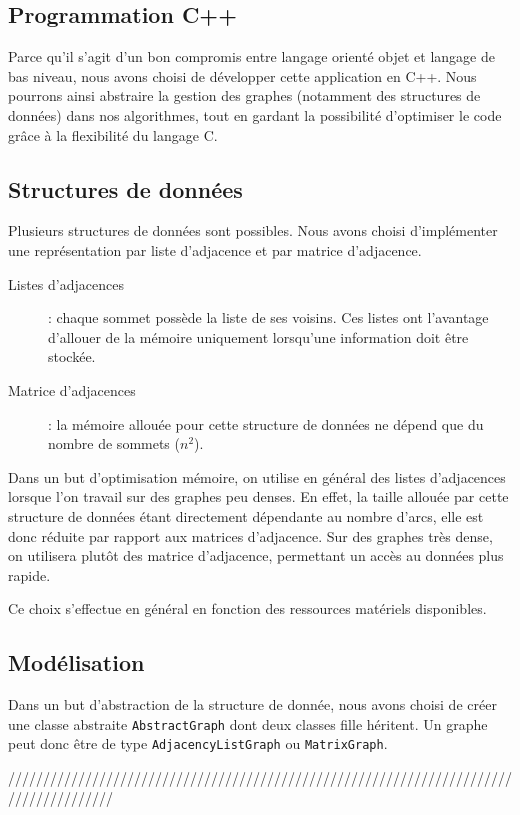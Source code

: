 \subsection{Programmation C++}
Parce qu'il s'agit d'un bon compromis entre langage orienté objet et langage de bas niveau, nous avons choisi de développer cette application en C++. Nous pourrons ainsi abstraire la gestion des graphes (notamment des structures de données) dans nos algorithmes, tout en gardant la possibilité d'optimiser le code grâce à la flexibilité du langage C.

\subsection{Structures de données}

Plusieurs structures de données sont possibles. Nous avons choisi d'implémenter une représentation par liste d'adjacence et par matrice d'adjacence.
\begin{description}
\item[Listes d'adjacences] : chaque sommet possède la liste de ses voisins. Ces listes ont l'avantage d'allouer de la mémoire uniquement lorsqu'une information doit être stockée. 
\item[Matrice d'adjacences] : la mémoire allouée pour cette structure de données ne dépend que du nombre de sommets ($n^2$).
\end{description}

Dans un but d'optimisation mémoire, on utilise en général des listes d'adjacences lorsque l'on travail sur des graphes peu denses. En effet, la taille allouée par cette structure de données étant directement dépendante au nombre d'arcs, elle est donc réduite par rapport aux matrices d'adjacence. Sur des graphes très dense, on utilisera plutôt des matrice d'adjacence, permettant un accès au données plus rapide. 

Ce choix s'effectue en général en fonction des ressources matériels disponibles.

\subsection{Modélisation}
Dans un but d'abstraction de la structure de donnée, nous avons choisi de créer une classe abstraite \texttt{AbstractGraph} dont deux classes fille héritent. Un graphe peut donc être de type \texttt{AdjacencyListGraph} ou \texttt{MatrixGraph}.

///////////////////////////////////////////////////////////////////////////////////////


